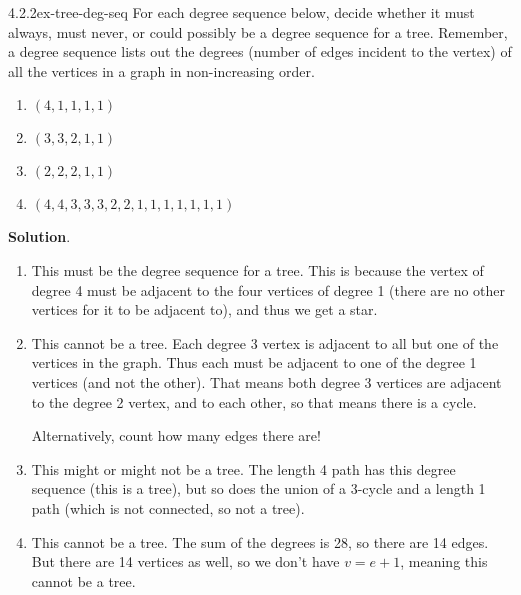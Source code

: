 \documentclass[twoside,11pt,]{book}
\numberwithin{equation}{chapter}
\begin{document}
\begin{divisionsolution}{4.2.2}{}{ex-tree-deg-seq}%
\hypertarget{p-4565}{}%
For each degree sequence below, decide whether it must always, must never, or could possibly be a degree sequence for a tree. Remember, a degree sequence lists out the degrees (number of edges incident to the vertex) of all the vertices in a graph in non-increasing order.\leavevmode%
\begin{enumerate}[label=(\alph*)]
\item\hypertarget{li-2264}{}\hypertarget{p-4566}{}%
\((4,1,1,1,1)\)%
\item\hypertarget{li-2265}{}\hypertarget{p-4567}{}%
\((3,3,2,1,1)\)%
\item\hypertarget{li-2266}{}\hypertarget{p-4568}{}%
\((2,2,2,1,1)\)%
\item\hypertarget{li-2267}{}\hypertarget{p-4569}{}%
\((4, 4, 3, 3, 3, 2, 2, 1, 1, 1, 1, 1, 1, 1)\)%
\end{enumerate}
%
\par\smallskip%
\noindent\textbf{Solution}.\quad%
\hypertarget{p-4570}{}%
\leavevmode%
\begin{enumerate}[label=(\alph*)]
\item\hypertarget{li-2268}{}\hypertarget{p-4571}{}%
This must be the degree sequence for a tree. This is because the vertex of degree 4 must be adjacent to the four vertices of degree 1 (there are no other vertices for it to be adjacent to), and thus we get a star.%
\item\hypertarget{li-2269}{}\hypertarget{p-4572}{}%
This cannot be a tree. Each degree 3 vertex is adjacent to all but one of the vertices in the graph. Thus each must be adjacent to one of the degree 1 vertices (and not the other). That means both degree 3 vertices are adjacent to the degree 2 vertex, and to each other, so that means there is a cycle.%
\par
\hypertarget{p-4573}{}%
Alternatively, count how many edges there are!%
\item\hypertarget{li-2270}{}\hypertarget{p-4574}{}%
This might or might not be a tree. The length 4 path has this degree sequence (this is a tree), but so does the union of a 3-cycle and a length 1 path (which is not connected, so not a tree).%
\item\hypertarget{li-2271}{}\hypertarget{p-4575}{}%
This cannot be a tree. The sum of the degrees is 28, so there are 14 edges. But there are 14 vertices as well, so we don't have \(v = e+1\), meaning this cannot be a tree.%
\end{enumerate}
%
\end{divisionsolution}%
\end{document}
